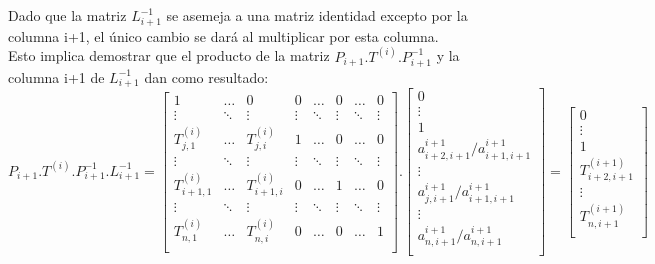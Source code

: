 Dado que la matriz $L_{i+1}^{-1}$ se asemeja a una matriz identidad excepto por la columna i+1, el único cambio se dará al multiplicar por esta columna.\\
Esto implica demostrar que el producto de la matriz $P_{i+1}.T^{(i)}.P_{i+1}^{-1}$ y la columna i+1 de $L_{i+1}^{-1}$ dan como resultado:\\

\[P_{i+1}.T^{(i)}.P_{i+1}^{-1}.L_{i+1}^{-1}=
\begin{bmatrix}
    1 & \dots & 0 & 0 & \dots &  0 & \dots & 0 \\
   \vdots & \ddots & \vdots & \vdots & \ddots & \vdots & \ddots & \vdots \\
   T_{j,1}^{(i)} & \dots &  T_{j,i}^{(i)} & 1 & \dots  & 0 & \dots & 0 \\
   \vdots  & \ddots & \vdots & \vdots & \ddots & \vdots & \ddots & \vdots \\
    T_{i+1,1}^{(i)} & \dots &  T_{i+1,i}^{(i)} & 0 & \dots  & 1 & \dots & 0 \\
   \vdots  & \ddots & \vdots & \vdots & \ddots & \vdots & \ddots & \vdots \\
    T_{n,1}^{(i)} & \dots &  T_{n,i}^{(i)} & 0 & \dots & 0 & \dots & 1 \\
\end{bmatrix}.
\begin{bmatrix}
0\\
\vdots\\
1\\
a_{i+2,i+1}^{i+1}/a_{i+1,i+1}^{i+1}\\
\vdots\\
a_{j,i+1}^{i+1}/a_{i+1,i+1}^{i+1}\\
\vdots\\
a_{n,i+1}^{i+1}/a_{n,i+1}^{i+1}\\
\end{bmatrix}=
\begin{bmatrix}
0\\
\vdots\\
1\\
T_{i+2,i+1}^{(i+1)}\\
\vdots\\
T_{n,i+1}^{(i+1)}\\
\end{bmatrix}
\]

